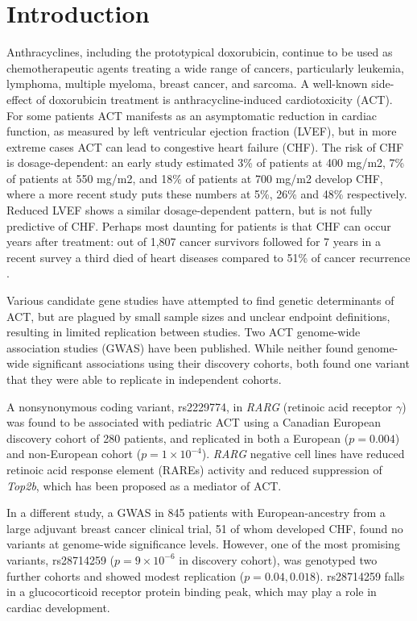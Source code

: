 \documentclass{article}
\begin{document}
\section*{Introduction}

Anthracyclines, including the prototypical doxorubicin, continue to be used as chemotherapeutic agents treating a wide range of cancers, particularly leukemia, lymphoma, multiple myeloma, breast cancer, and sarcoma. 
A well-known side-effect of doxorubicin treatment is anthracycline-induced cardiotoxicity (ACT). 
For some patients ACT manifests as an asymptomatic reduction in cardiac function, as measured by left ventricular ejection fraction (LVEF), but in more extreme cases ACT can lead to congestive heart failure (CHF). 
The risk of CHF is dosage-dependent: an early study\cite{von1979risk} estimated 3\% of patients at 400 mg/m2, 7\% of patients at 550 mg/m2, and 18\% of patients at 700 mg/m2 develop CHF, where a more recent study puts these numbers at 5\%, 26\% and 48\% respectively\cite{Swain2003}. 
Reduced LVEF shows a similar dosage-dependent pattern, but is not fully predictive of CHF. 
Perhaps most daunting for patients is that CHF can occur years after treatment: out of 1,807 cancer survivors followed for 7 years in a recent survey a third died of heart diseases compared to 51\% of cancer recurrence \cite{vejpongsa2014prevention}. 


Various candidate gene studies have attempted to find genetic determinants of ACT, but are plagued by small sample sizes and unclear endpoint definitions, resulting in limited replication between studies. 
Two ACT genome-wide association studies (GWAS) have been published\cite{Aminkeng2015,Schneider2016}. 
While neither found genome-wide significant associations using their discovery cohorts, both found one variant that they were able to replicate in independent cohorts. 

A nonsynonymous coding variant, rs2229774, in \emph{RARG} (retinoic acid receptor $\gamma$) was found to be associated with pediatric ACT using a Canadian European discovery cohort of 280 patients\cite{Aminkeng2015}, and replicated in both a European ($p=0.004$) and non-European cohort ($p=1 \times 10^{-4}$). 
\emph{RARG} negative cell lines have reduced retinoic acid response element (RAREs) activity and reduced suppression of \emph{Top2b}\cite{Aminkeng2015}, which has been proposed as a mediator of ACT. 

In a different study, a GWAS in 845 patients with European-ancestry from a large adjuvant breast cancer clinical trial, 51 of whom developed CHF, found no variants at genome-wide significance levels\cite{Schneider2016}. However, one of the most promising variants, rs28714259 ($p=9 \times 10^{-6}$ in discovery cohort), was genotyped two further cohorts and showed modest replication ($p=0.04, 0.018$). rs28714259 falls in a glucocorticoid receptor protein binding peak, which may play a role in cardiac development. 
\end{document}
